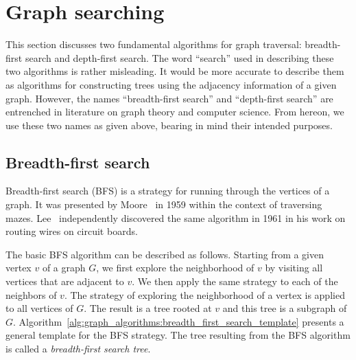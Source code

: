 
\section{Graph searching}
\label{sec:graph_algorithms:graph_searching}

This section discusses two fundamental algorithms for graph traversal:
breadth-first search and depth-first search. The word ``search'' used
in describing these two algorithms is rather misleading. It would be
more accurate to describe them as algorithms for constructing trees
using the adjacency information of a given graph. However, the names
``breadth-first search'' and ``depth-first search'' are entrenched in
literature on graph theory and computer science. From hereon, we use
these two names as given above, bearing in mind their intended
purposes.



\subsection{Breadth-first search}

Breadth-first search (BFS) is a strategy for running through the
vertices of a graph. It was presented by Moore~\cite{Moore1959} in
1959 within the context of traversing mazes. Lee~\cite{Lee1961}
independently discovered the same algorithm in 1961 in his work on
routing wires on circuit boards.

The basic BFS algorithm can be described as follows. Starting from a
given vertex $v$ of a graph $G$, we first explore the neighborhood of
$v$ by visiting all vertices that are adjacent to $v$. We then apply
the same strategy to each of the neighbors of $v$. The strategy of
exploring the neighborhood of a vertex is applied to all vertices of
$G$. The result is a tree rooted at $v$ and this tree is a subgraph of
$G$. Algorithm~\ref{alg:graph_algorithms:breadth_first_search_template}
presents a general template for the BFS strategy. The tree resulting
from the BFS algorithm is called a \emph{breadth-first search tree}.

